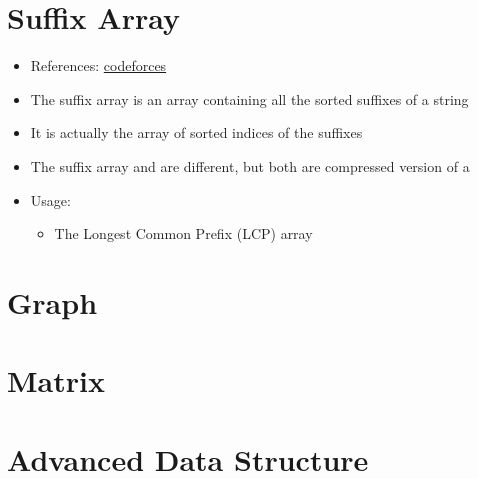 \section{Suffix Array}
\begin{itemize}
	\item References: \href{https://codeforces.com/edu/course/2/lesson/2/1}{codeforces}
	\item The suffix array is an array containing all the sorted suffixes of a string
	\item It is actually the array of sorted indices of the suffixes
	\item The suffix array and  are different, but both are compressed version of a 
	\item Usage:
	\begin{itemize}
		\item The Longest Common Prefix (LCP) array
	\end{itemize}
\end{itemize}

\section{Graph}

\section{Matrix}

\section{Advanced Data Structure}